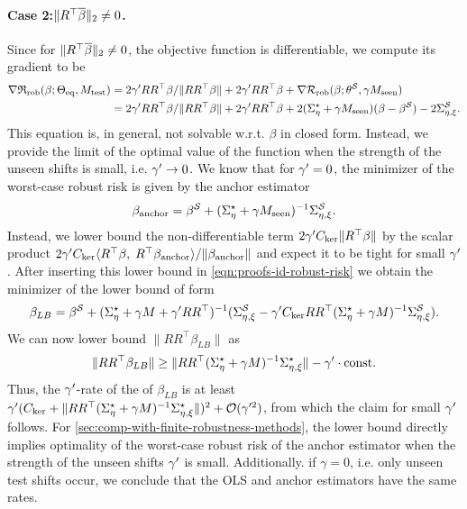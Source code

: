 \paragraph{Case 2:$\| R^\top \overline{\beta} \|_2 \neq 0$.} Since for $\| R^\top \overline{\beta} \|_2 \neq 0$, the objective function is differentiable, we compute its gradient to be
\begin{align*}
    \nabla  \mathfrak{R}_{\mathrm{rob}}(\beta; \Theta_{\mathrm{eq}}, M_{\mathrm{test}}) &= 2 \gamma' R R^\top \beta / \| R R^\top \beta \| + 2 \gamma' R R^\top \beta + \nabla \mathcal{R}_{\mathrm{rob}}(\beta; \theta^{\mathcal{S}}, \gamma M_{\mathrm{seen}}) \\ 
    &= 2 \gamma' R R^\top \beta / \| R R^\top \beta \| + 2 \gamma' R R^\top \beta  + 2(\Sigma^\star_{\eta} + \gamma M_{\mathrm{seen}}) (\beta - \beta^{\mathcal{S}}) - 2 \Sigma^{\mathcal{S}}_{\eta,\xi}. 
\end{align*}
This equation is, in general, not solvable w.r.t. $\beta$ in closed form. Instead, we provide the limit of the optimal value of the function when the strength of the unseen shifts is small, i.e. $\gamma' \to 0$. We know that for $\gamma' = 0$, the minimizer of the worst-case robust risk is given by the anchor estimator
\begin{align*}
    \beta_{\text{anchor}} = \beta^{\mathcal{S}} + (\Sigma^\star_{\eta} + \gamma M_{\mathrm{seen}})^{-1} \Sigma^{\mathcal{S}}_{\eta,\xi}. 
\end{align*}
Instead, we lower bound the non-differentiable term $2 \gamma' C_{\mathrm{ker}} \| R^\top \beta \|$ by the scalar product $2 \gamma' C_{\mathrm{ker}} \langle R^\top \beta , \; R^\top \beta_{\text{anchor}} \rangle/ \| \beta_{\text{anchor}} \|$ and expect it to be tight for small $\gamma'$. After inserting this lower bound in \cref{eqn:proofs-id-robust-risk} we obtain the minimizer of the lower bound of form
\begin{align*}
    \beta_{LB} = \beta^{\mathcal{S}} + (\Sigma^\star_{\eta} + \gamma M + \gamma' R R^\top)^{-1}(\Sigma^{\mathcal{S}}_{\eta,\xi} - \gamma' C_{\mathrm{ker}} R R^\top (\Sigma^\star_{\eta} + \gamma M)^{-1} \Sigma^{\mathcal{S}}_{\eta,\xi}).
\end{align*}
We can now lower bound $\| R R^\top \beta_{LB} \|$ as 
\begin{equation}\label{eqn:small-gammaprime-lower-bound}
    \| R R^\top \beta_{LB} \| \geq \| R R^\top (\Sigma^\star_{\eta} + \gamma M)^{-1} \Sigma^\star_{\eta,\xi} \| - \gamma' \cdot \text{const}.
\end{equation}
Thus, the $\gamma'$-rate of the \idRRs of $\beta_{LB}$ is at least $\gamma' (C_{\mathrm{ker}} + \| R R^\top (\Sigma^\star_{\eta} + \gamma M)^{-1} \Sigma^\star_{\eta,\xi} \|)^2 + \mathcal{O}(\gamma'^2)$,
from which the claim for small $\gamma'$ follows. For \cref{sec:comp-with-finite-robustness-methods}, the lower bound directly implies optimality of the worst-case robust risk of the anchor estimator when the strength of the unseen shifts $\gamma'$ is small. Additionally. if $\gamma = 0$, i.e. only unseen test shifts occur, we conclude that the OLS and anchor estimators have the same rates. 
